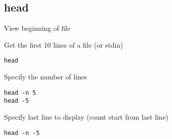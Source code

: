 \subsection{head}

\begin{frame}[fragile]{View beginning of file}
  \begin{exampleblock}{Get the first 10 lines of a file (or stdin)}
    \begin{lstlisting}[showstringspaces=false,basicstyle=\tiny]
head
    \end{lstlisting}
  \end{exampleblock}
\pause

  \begin{exampleblock}{Specify the number of lines}
    \begin{lstlisting}[showstringspaces=false,basicstyle=\tiny]
head -n 5
head -5
    \end{lstlisting}
  \end{exampleblock}
\pause

  \begin{exampleblock}{Specify last line to display (count start from last line)}
    \begin{lstlisting}[showstringspaces=false,basicstyle=\tiny]
head -n -5
    \end{lstlisting}
  \end{exampleblock}
\end{frame}


